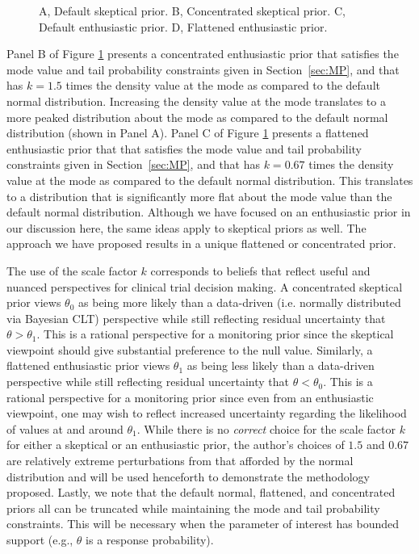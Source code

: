 \documentclass[AMA,STIX1COL,doublespace]{WileyNJD-v2}
\begin{document}
\begin{figure}
\begin{center}
\caption{A, Default skeptical prior. B, Concentrated skeptical prior. C, Default enthusiastic prior. D, Flattened enthusiastic prior.}

\label{fig:figure1}
\end{center}
\end{figure}

{Panel B of Figure \ref{fig:figure1} presents a concentrated enthusiastic prior that satisfies 
the mode value and tail probability constraints given in Section~\ref{sec:MP}, and that has $k=1.5$ times the density value at the mode as compared to the default normal distribution. 
Increasing the density value at the mode translates to a more peaked distribution about the mode as compared to the default normal distribution (shown in Panel A). 
%
Panel C of Figure \ref{fig:figure1} presents a flattened enthusiastic prior that that satisfies the mode value and tail probability constraints given in Section~\ref{sec:MP}, and
that has $k=0.67$ times the density value at the mode as compared to the default normal distribution. This translates to a distribution that is significantly more flat about the mode value than the default normal distribution. 
%
Although we have focused on an enthusiastic prior in our discussion here, the same ideas apply to skeptical priors as well.
%
The approach we have proposed results in a unique flattened or concentrated prior.

The use of the scale factor $k$ corresponds to beliefs that reflect useful and nuanced perspectives for clinical trial decision making.
%
A concentrated skeptical prior views $\theta_0$ as being more likely than a data-driven (i.e. normally distributed via Bayesian CLT) perspective while still reflecting residual uncertainty that $\theta>\theta_1$.
%
This is a rational perspective for a monitoring prior since the skeptical viewpoint should give substantial preference to the null value.
%
Similarly, a flattened enthusiastic prior views $\theta_1$ as being less likely than a data-driven perspective while still reflecting residual uncertainty that $\theta<\theta_0$.
%
This is a rational perspective for a monitoring prior since even from an enthusiastic viewpoint, one may wish to reflect increased uncertainty regarding the likelihood of values at and around $\theta_1$.
%
While there is no \textit{correct} choice for the scale factor $k$ for either a skeptical or an enthusiastic prior, the author's choices
of $1.5$ and $0.67$ are relatively extreme perturbations from that afforded by the normal distribution and will be used henceforth to 
demonstrate the methodology proposed. 
Lastly, we note that the default normal, flattened, and concentrated priors all can be truncated while maintaining the mode and tail 
probability constraints.
This will be necessary when the parameter of interest has bounded support (e.g., $\theta$ is a response probability).
}
\end{document}
